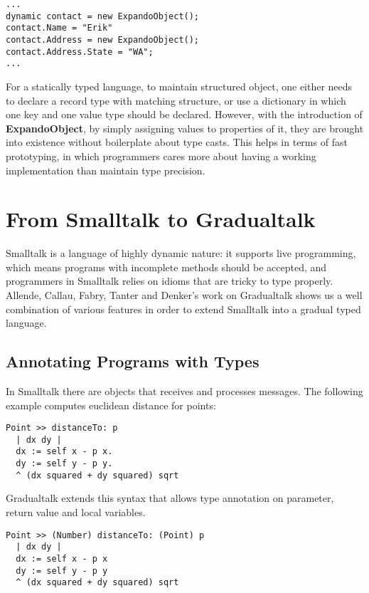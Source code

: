 \begin{verbatim}
...
dynamic contact = new ExpandoObject();
contact.Name = "Erik"
contact.Address = new ExpandoObject();
contact.Address.State = "WA";
...
\end{verbatim}

For a statically typed language, to maintain structured object,
one either needs to declare a record type with matching structure,
or use a dictionary in which one key and one value type should be declared.
However, with the introduction of \textbf{ExpandoObject},
by simply assigning values to properties of it,
they are brought into existence without boilerplate about type casts.
This helps in terms of fast prototyping, in which programmers cares more about
having a working implementation than maintain type precision.

\section{From Smalltalk to Gradualtalk}

Smalltalk is a language of highly dynamic nature:
it supports live programming, which means programs with incomplete
methods should be accepted, and programmers in Smalltalk relies on
idioms that are tricky to type properly.
Allende, Callau, Fabry, Tanter and Denker's work on Gradualtalk shows
us a well combination of various features in order to extend Smalltalk
into a gradual typed language.

\subsection{Annotating Programs with Types}

In Smalltalk there are objects that receives and processes messages.
The following example computes euclidean distance for points:

\begin{verbatim}
Point >> distanceTo: p
  | dx dy |
  dx := self x - p x.
  dy := self y - p y.
  ^ (dx squared + dy squared) sqrt
\end{verbatim}

Gradualtalk extends this syntax that allows
type annotation on parameter, return value and local variables.

\begin{verbatim}
Point >> (Number) distanceTo: (Point) p
  | dx dy |
  dx := self x - p x
  dy := self y - p y
  ^ (dx squared + dy squared) sqrt
\end{verbatim}

